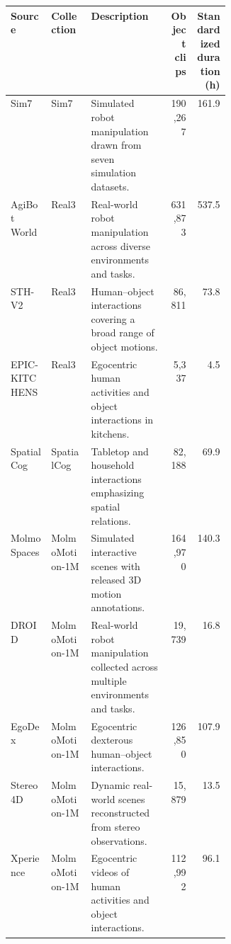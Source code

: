 \begin{table}[t]
\centering
\footnotesize
\setlength{\tabcolsep}{3.5pt}
\renewcommand{\arraystretch}{1.12}
\begin{tabular}{@{}ll>{\raggedright\arraybackslash}p{0.36\linewidth}rr@{}}
\toprule
Source
& Collection
& Description
& \shortstack{Object\\clips}
& \shortstack{Standardized\\duration (h)} \\
\midrule
Sim7
& Sim7
& Simulated robot manipulation drawn from seven simulation datasets.
& 190,267 & 161.9 \\
\cmidrule(lr){1-5}

AgiBot World
& Real3
& Real-world robot manipulation across diverse environments and tasks.
& 631,873 & 537.5 \\
\cmidrule(lr){1-5}

STH-V2
& Real3
& Human--object interactions covering a broad range of object motions.
& 86,811 & 73.8 \\
\cmidrule(lr){1-5}

EPIC-KITCHENS
& Real3
& Egocentric human activities and object interactions in kitchens.
& 5,337 & 4.5 \\
\cmidrule(lr){1-5}

SpatialCog
& SpatialCog
& Tabletop and household interactions emphasizing spatial relations.
& 82,188 & 69.9 \\
\cmidrule(lr){1-5}

MolmoSpaces
& MolmoMotion-1M
& Simulated interactive scenes with released 3D motion annotations.
& 164,970 & 140.3 \\
\cmidrule(lr){1-5}

DROID
& MolmoMotion-1M
& Real-world robot manipulation collected across multiple environments
and tasks.
& 19,739 & 16.8 \\
\cmidrule(lr){1-5}

EgoDex
& MolmoMotion-1M
& Egocentric dexterous human--object interactions.
& 126,850 & 107.9 \\
\cmidrule(lr){1-5}

Stereo4D
& MolmoMotion-1M
& Dynamic real-world scenes reconstructed from stereo observations.
& 15,879 & 13.5 \\
\cmidrule(lr){1-5}

Xperience
& MolmoMotion-1M
& Egocentric videos of human activities and object interactions.
& 112,992 & 96.1 \\
\cmidrule(lr){1-5}


\end{tabular}
\end{table}
